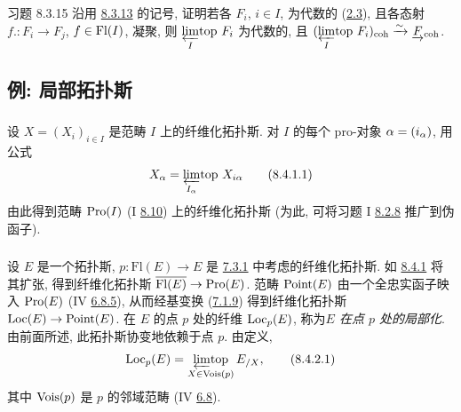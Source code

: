 \begin{enonce*}[remark]{习题 8.3.15}
沿用 \hyperref[VI.thm8.3.13]{8.3.13} 的记号,
证明若各 $F_i$, $i\in I$, 为代数的
(\hyperref[VI.def2.3]{2.3}),
且各态射 $f.:F_i\to F_j$, $f\in\text{\rm Fl}(I)$,
凝聚,\pageoriginale{}
则 ${\displaystyle{\varprojlim_{I}\!\mbox{\rm top }}}F_i$ 为代数的,
且 $({\displaystyle{\varprojlim_{I}\!\mbox{\rm top }}}F_i)_{\mathrm{coh}}\xrightarrow{\sim}\underrightarrow{F}_{\mathrm{coh}}$.
\end{enonce*}




\subsection{例: 局部拓扑斯}

\subsubsection{}

设 $X=(X_i)_{i\in I}$ 是范畴 $I$ 上的纤维化拓扑斯.
对 $I$ 的每个 pro-对象 $\protect\mathcal{\alpha}=(i_{\alpha})$,
用公式
\begin{equation*}
X_{\protect\mathcal{\alpha}}={\displaystyle{\varprojlim_{I_{\alpha}}\!\mbox{\rm top }}}X_{i\alpha}\tag{8.4.1.1}
\end{equation*}
由此得到范畴 $\operatorname{Pro}(I)$ (I \hyperref[I.sec8.10]{8.10}) 上的纤维化拓扑斯
(为此, 可将习题 I \hyperref[I.exer8.2.8]{8.2.8} 推广到伪函子).

\subsubsection{}

设 $E$ 是一个拓扑斯,
$p:\text{Fl}(E)\to E$ 是 \hyperref[VI.exem7.3.1]{7.3.1}
中考虑的纤维化拓扑斯.
如 \hyperref[VI.subsubsec8.4.1]{8.4.1} 将其扩张,
得到纤维化拓扑斯 $\bar{\text{Fl}(E)}\to\Pro(E)$.
范畴 $\operatorname{Point}(E)$ 由一个全忠实函子映入 $\operatorname{Pro}(E)$
(IV \hyperref[IV.subsubsec6.8.5]{6.8.5}),
从而经基变换 (\hyperref[VI.subsubsec7.1.9]{7.1.9})
得到纤维化拓扑斯 $\Loc(E)\to\Point(E)$.
在 $E$ 的点 $p$ 处的纤维 $\operatorname{Loc}_p(E)$,
称为\emph{$E$ 在点 $p$ 处的局部化}.
由前面所述, 此拓扑斯协变地依赖于点 $p$.
由定义,
\begin{equation*}
\operatorname{Loc}_p(E)=\mathop{\varprojlim\!\mbox{\rm top}}_{X\in\operatorname{Vois}(p)}E_{/X}{},\tag{8.4.2.1}
\end{equation*}
其中 $\operatorname{Vois}(p)$ 是 $p$ 的邻域范畴
(IV \hyperref[IV.subsec6.8]{6.8}).

